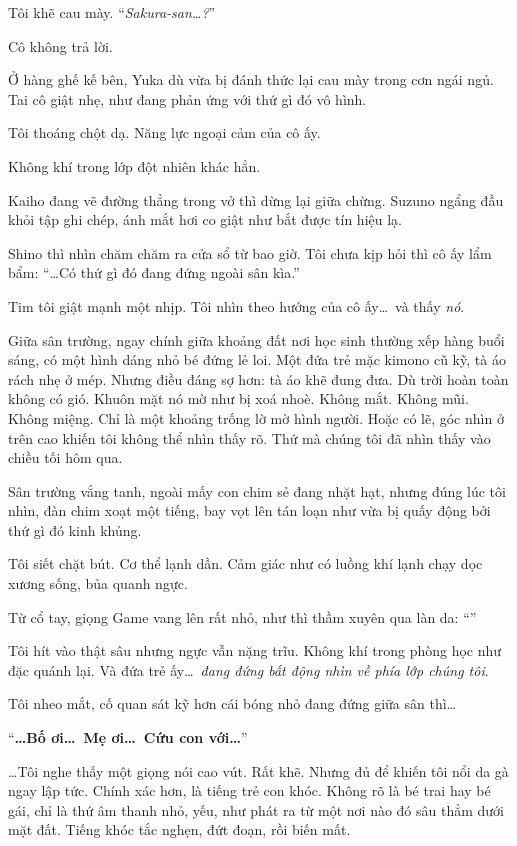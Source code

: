 \documentclass[../main.tex]{subfiles}
\begin{document}
Tôi khẽ cau mày. ``\textit{Sakura-san\dots?}''

Cô không trả lời.

Ở hàng ghế kế bên, Yuka dù vừa bị đánh thức lại cau mày trong cơn ngái ngủ. Tai cô giật nhẹ, như đang phản ứng với thứ gì đó vô hình.

Tôi thoáng chột dạ. Năng lực ngoại cảm của cô ấy.

Không khí trong lớp đột nhiên khác hẳn.

Kaiho đang vẽ đường thẳng trong vở thì dừng lại giữa chừng. Suzuno ngẩng đầu khỏi tập ghi chép, ánh mắt hơi co giật như bắt được tín hiệu lạ.

Shino thì nhìn chăm chăm ra cửa sổ từ bao giờ. Tôi chưa kịp hỏi thì cô ấy lẩm bẩm: ``\dots Có thứ gì đó đang đứng ngoài sân kìa.''

Tim tôi giật mạnh một nhịp. Tôi nhìn theo hướng của cô ấy\dots\ và thấy \emph{nó}.

Giữa sân trường, ngay chính giữa khoảng đất nơi học sinh thường xếp hàng buổi sáng, có một hình dáng nhỏ bé đứng lẻ loi. Một đứa trẻ mặc kimono cũ kỹ, tà áo rách nhẹ ở mép.  Nhưng điều đáng sợ hơn: tà áo khẽ đung đưa. Dù trời hoàn toàn không có gió. Khuôn mặt nó mờ như bị xoá nhoè. Không mắt. Không mũi. Không miệng. Chỉ là một khoảng trống lờ mờ hình người. Hoặc có lẽ, góc nhìn ở trên cao khiến tôi không thể nhìn thấy rõ. Thứ mà chúng tôi đã nhìn thấy vào chiều tối hôm qua.

Sân trường vắng tanh, ngoài mấy con chim sẻ đang nhặt hạt, nhưng đúng lúc tôi nhìn, đàn chim xoạt một tiếng, bay vọt lên tán loạn như vừa bị quấy động bởi thứ gì đó kinh khủng.

Tôi siết chặt bút. Cơ thể lạnh dần. Cảm giác như có luồng khí lạnh chạy dọc xương sống, bủa quanh ngực.

Từ cổ tay, giọng Game vang lên rất nhỏ, như thì thầm xuyên qua làn da: ``''

Tôi hít vào thật sâu nhưng ngực vẫn nặng trĩu. Không khí trong phòng học như đặc quánh lại. Và đứa trẻ ấy\dots\ \emph{đang đứng bất động nhìn về phía lớp chúng tôi}.

Tôi nheo mắt, cố quan sát kỹ hơn cái bóng nhỏ đang đứng giữa sân thì\dots

``\textbf{\dots Bố ơi\dots\ Mẹ ơi\dots\ Cứu con với\dots}''

\dots Tôi nghe thấy một giọng nói cao vút. Rất khẽ. Nhưng đủ để khiến tôi nổi da gà ngay lập tức. Chính xác hơn, là tiếng trẻ con khóc. Không rõ là bé trai hay bé gái, chỉ là thứ âm thanh nhỏ, yếu, như phát ra từ một nơi nào đó sâu thẳm dưới mặt đất. Tiếng khóc tắc nghẹn, đứt đoạn, rồi biến mất.
\end{document}
